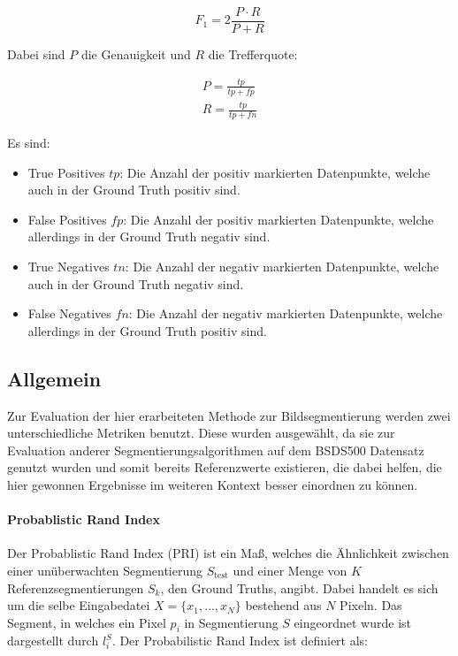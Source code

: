 \begin{equation}
F_1 = 2\frac{P\cdot R}{P+R}
\end{equation}

Dabei sind $P$ die Genauigkeit und $R$ die Trefferquote:

\begin{eqnarray}
P = \frac{tp}{tp+fp}\\
R = \frac{tp}{tp+fn}
\end{eqnarray}

Es sind:

\begin{itemize}
	\item{True Positives $tp$:} Die Anzahl der positiv markierten Datenpunkte, welche auch in der Ground Truth positiv sind.
	\item{False Positives $fp$:} Die Anzahl der positiv markierten Datenpunkte, welche allerdings in der Ground Truth negativ sind.
	\item{True Negatives $tn$:} Die Anzahl der negativ markierten Datenpunkte, welche auch in der Ground Truth negativ sind.
	\item{False Negatives $fn$:} Die Anzahl der negativ markierten Datenpunkte, welche allerdings in der Ground Truth positiv sind.
\end{itemize}

\subsection{Allgemein}
\label{ssec:eval_general}

Zur Evaluation der hier erarbeiteten Methode zur Bildsegmentierung werden zwei unterschiedliche Metriken benutzt. Diese wurden ausgewählt, da sie zur Evaluation anderer Segmentierungsalgorithmen auf dem BSDS500 Datensatz \cite{bsd500} genutzt wurden und somit bereits Referenzwerte existieren, die dabei helfen, die hier gewonnen Ergebnisse im weiteren Kontext besser einordnen zu können. \cite{arbelaez_10, xia_17}

\paragraph{Probablistic Rand Index}

Der Probablistic Rand Index (PRI) ist ein Maß, welches die Ähnlichkeit zwischen einer unüberwachten Segmentierung $S_\text{test}$ und einer Menge von $K$ Referenzsegmentierungen $S_k$, den Ground Truths, angibt. Dabei handelt es sich um die selbe Eingabedatei $X=\{x_1,\ldots,x_N\}$ bestehend aus $N$ Pixeln. Das Segment, in welches ein Pixel $p_i$ in Segmentierung $S$ eingeordnet wurde ist dargestellt durch $l_i^S$. Der Probabilistic Rand Index ist definiert als: \cite{pantofaru_07}

